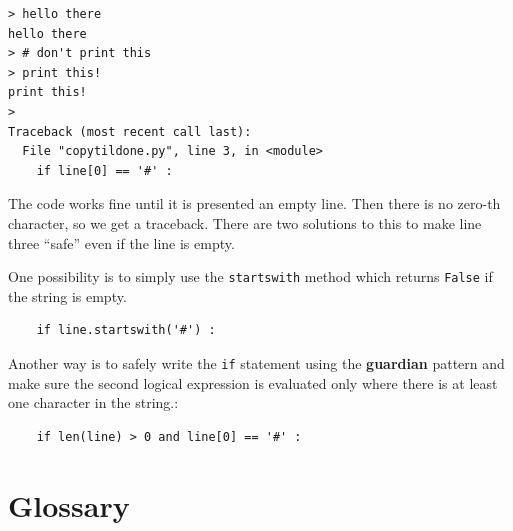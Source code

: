 \beforeverb
\begin{verbatim}
> hello there
hello there
> # don't print this
> print this!
print this!
> 
Traceback (most recent call last):
  File "copytildone.py", line 3, in <module>
    if line[0] == '#' :
\end{verbatim}
\afterverb
%
The code works fine until it is presented an empty line.  Then
there is no zero-th character, so we get a traceback.  There are two
solutions to this to make line three ``safe'' even if the line is 
empty.

One possibility is to simply use the {\tt startswith} method
which returns {\tt False} if the string is empty.

\beforeverb
\begin{verbatim}
    if line.startswith('#') :
\end{verbatim}
\afterverb
%
Another way is to safely write the {\tt if} statement using the {\bf guardian}
pattern and make sure the second logical expression is evaluated 
only where there is at least one character in the string.:

\beforeverb
\begin{verbatim}
    if len(line) > 0 and line[0] == '#' :
\end{verbatim}
\afterverb
%

\section{Glossary}


